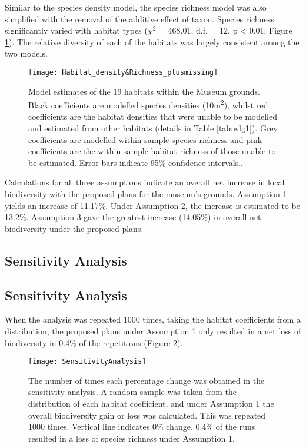 Similar to the species density model, the species richness model was also simplified with the removal of the additive effect of taxon. Species richness significantly varied with habitat types ($\chi^2$ = 468.01, d.f. = 12, p < 0.01; Figure \ref{fig:wlgmodel}). The relative diversity of each of the habitats was largely consistent among the two models.
 	 
\begin{figure}[t]
	\centering
	\texttt{[image: Habitat\_density\&Richness\_plusmissing]}
	\caption{Model estimates of the 19 habitats within the Museum grounds. Black coefficients are modelled species densities (10m\textsuperscript{2}), whilst red coefficients are the habitat densities that were unable to be modelled and estimated from other habitats (details in Table \ref{tab:wlg1}). Grey coefficients are modelled within-sample species richness and pink coefficients are the within-sample habitat richness of those unable to be estimated. Error bars indicate 95\% confidence intervals..}
   	 \label{fig:wlgmodel}
\end{figure}
	
Calculations for all three assumptions indicate an overall net increase in local biodiversity with the proposed plans for the museum's grounds. Assumption 1 yields an increase of 11.17\%. Under Assumption 2, the increase is estimated to be 13.2\%. Assumption 3 gave the greatest increase (14.05\%) in overall net biodiversity under the proposed plans.

\ifappendixStyle %
\subsection{Sensitivity Analysis}%
\else
\subsection*{Sensitivity Analysis}
\fi

When the analysis was repeated 1000 times, taking the habitat coefficients from a distribution, the proposed plans under Assumption 1 only resulted in a net loss of biodiversity in 0.4\% of the repetitions (Figure \ref{fig:wlgsensitivity}).

\begin{figure}[t]
	\centering
	\texttt{[image: SensitivityAnalysis]}
	\caption{The number of times each percentage change was obtained in the sensitivity analysis. A random sample was taken from the distribution of each habitat coefficient, and under Assumption 1 the overall biodiversity gain or loss was calculated. This was repeated 1000 times. Vertical line indicates 0\% change. 0.4\% of the runs resulted in a loss of species richness under Assumption 1.}
   	 \label{fig:wlgsensitivity}
\end{figure}

